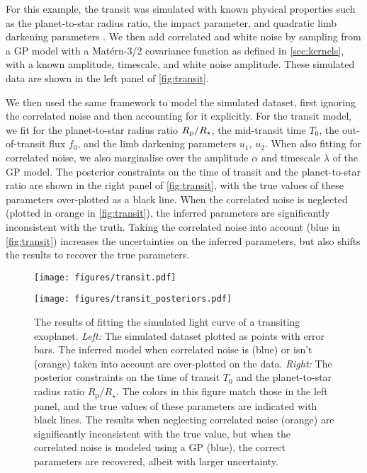 \documentclass[letterpaper]{ar-1col}
\newcommand{\amplitude}{\ensuremath{\alpha}}
\newcommand{\lengthscale}{\ensuremath{\lambda}}
\begin{document}
For this example, the transit was simulated with known physical properties such as the planet-to-star radius ratio, the impact parameter, and quadratic limb darkening parameters \citep{2020AJ....159..123A}.
We then add correlated and white noise by sampling from a GP model with a Mat\'ern-3/2 covariance function as defined in \autoref{sec:kernels}, with a known amplitude, timescale, and white noise amplitude.
These simulated data are shown in the left panel of \autoref{fig:transit}.

We then used the same framework to model the simulated dataset, first ignoring the correlated noise and then accounting for it explicitly.
For the transit model, we fit for the planet-to-star radius ratio $R_{\rm p}/R_\star$, the mid-transit time $T_0$, the out-of-transit flux $f_0$, and the limb darkening parameters $u_1,\,u_2$.
When also fitting for correlated noise, we also marginalise over the amplitude $\amplitude$ and timescale $\lengthscale$ of the GP model.
The posterior constraints on the time of transit and the planet-to-star ratio are shown in the right panel of \autoref{fig:transit}, with the true values of these parameters over-plotted as a black line.
When the correlated noise is neglected (plotted in orange in \autoref{fig:transit}), the inferred parameters are significantly inconsistent with the truth.
Taking the correlated noise into account (blue in \autoref{fig:transit}) increases the uncertainties on the inferred parameters, but also shifts the results to recover the true parameters.

\begin{figure}[ht]
  \centering
  \begin{minipage}[t]{0.5\linewidth}
    \texttt{[image: figures/transit.pdf]}
  \end{minipage} \hfill
  \begin{minipage}[t]{0.44\linewidth}
    \texttt{[image: figures/transit\_posteriors.pdf]}
  \end{minipage}
  \caption{The results of fitting the simulated light curve of a transiting exoplanet.
  \emph{Left:} The simulated dataset plotted as points with error bars.
  The inferred model when correlated noise is (blue) or isn't (orange) taken into account are over-plotted on the data.
  \emph{Right:} The posterior constraints on the time of transit $T_0$ and the planet-to-star radius ratio $R_\mathrm{p}/R_\star$.
  The colors in this figure match those in the left panel, and the true values of these parameters are indicated with black lines.
  The results when neglecting correlated noise (orange) are significantly inconsistent with the true value, but when the correlated noise is modeled using a GP (blue), the correct parameters are recovered, albeit with larger uncertainty.}
  \label{fig:transit}
\end{figure}
\end{document}
